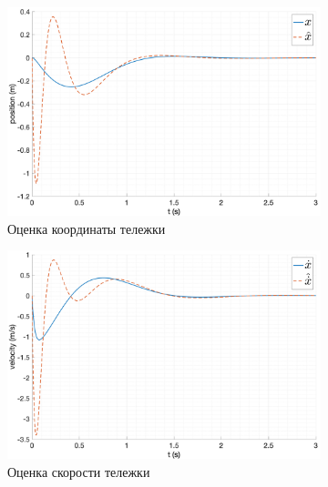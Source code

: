 \begin{figure}[ht!]
    \centering
    \begin{subfigure}[b]{0.45\textwidth}
        \includegraphics[width=\textwidth]{media/plots/modal_observer/observer_x_cmp_2.png}
        \caption{Оценка координаты тележки}
        \label{fig:observer_x_cmp_2}
    \end{subfigure}
    \begin{subfigure}[b]{0.45\textwidth}
        \includegraphics[width=\textwidth]{media/plots/modal_observer/observer_dotx_cmp_2.png}
        \caption{Оценка скорости тележки}
        \label{fig:observer_dotx_cmp_2}
    \end{subfigure}
    \begin{subfigure}[b]{0.45\textwidth}

\end{subfigure}
\end{figure}
